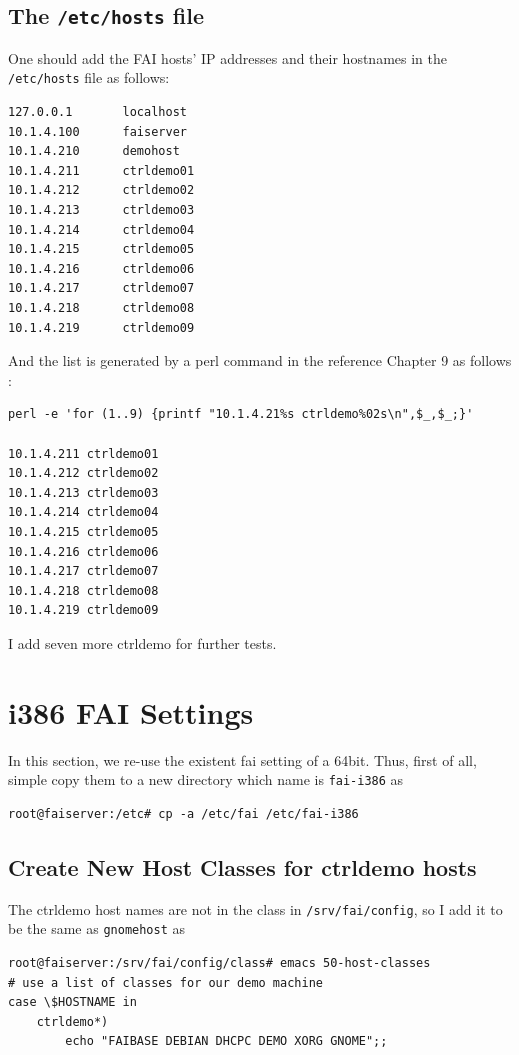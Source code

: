 \documentclass[11pt
  , a4paper
  , article
  , oneside
]{memoir}
\begin{document}
\subsection{The \texttt{/etc/hosts} file}
One should add the FAI hosts' IP addresses and their hostnames in the \texttt{/etc/hosts} file as follows:

\begin{lstlisting}
127.0.0.1       localhost
10.1.4.100      faiserver
10.1.4.210      demohost
10.1.4.211      ctrldemo01
10.1.4.212      ctrldemo02
10.1.4.213      ctrldemo03
10.1.4.214      ctrldemo04
10.1.4.215      ctrldemo05
10.1.4.216      ctrldemo06
10.1.4.217      ctrldemo07
10.1.4.218      ctrldemo08
10.1.4.219      ctrldemo09
\end{lstlisting}
And the list is generated by a perl command in the reference \citep{faiguide} Chapter 9 as follows :
\begin{lstlisting}
perl -e 'for (1..9) {printf "10.1.4.21%s ctrldemo%02s\n",$_,$_;}'

10.1.4.211 ctrldemo01
10.1.4.212 ctrldemo02
10.1.4.213 ctrldemo03
10.1.4.214 ctrldemo04
10.1.4.215 ctrldemo05
10.1.4.216 ctrldemo06
10.1.4.217 ctrldemo07
10.1.4.218 ctrldemo08
10.1.4.219 ctrldemo09
\end{lstlisting}
I add seven more ctrldemo for further tests.

\section{i386 FAI Settings}
In this section, we re-use the existent fai setting of a 64bit. Thus, first of all, simple copy them to a new directory which name is \texttt{fai-i386} as 

\begin{lstlisting}
root@faiserver:/etc# cp -a /etc/fai /etc/fai-i386
\end{lstlisting}

\subsection{Create New Host Classes for ctrldemo hosts}

The ctrldemo host names are not in the class in \texttt{/srv/fai/config}, so I add it to be the same as \texttt{gnomehost} as 

\begin{lstlisting}
root@faiserver:/srv/fai/config/class# emacs 50-host-classes 
# use a list of classes for our demo machine                                                                                                                
case \$HOSTNAME in
    ctrldemo*)
        echo "FAIBASE DEBIAN DHCPC DEMO XORG GNOME";;
\end{lstlisting}
\end{document}
